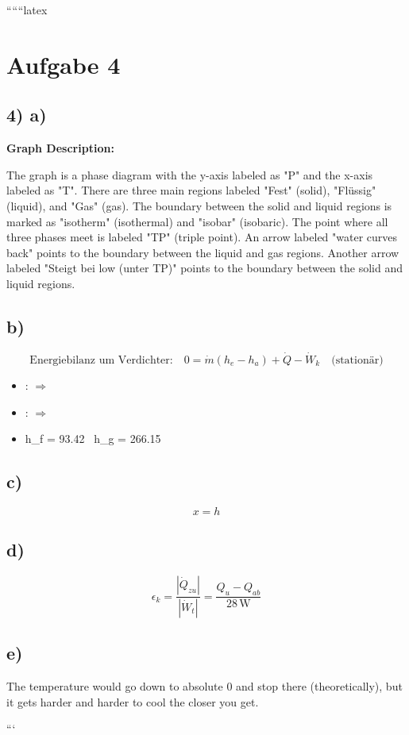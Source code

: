 
``````latex


\section*{Aufgabe 4}

\subsection*{4) a)}

\begin{center}
\textbf{Graph Description:}
\end{center}

The graph is a phase diagram with the y-axis labeled as "P" and the x-axis labeled as "T". There are three main regions labeled "Fest" (solid), "Flüssig" (liquid), and "Gas" (gas). The boundary between the solid and liquid regions is marked as "isotherm" (isothermal) and "isobar" (isobaric). The point where all three phases meet is labeled "TP" (triple point). An arrow labeled "water curves back" points to the boundary between the liquid and gas regions. Another arrow labeled "Steigt bei low (unter TP)" points to the boundary between the solid and liquid regions.

\subsection*{b)}

\begin{equation*}
\text{Energiebilanz um Verdichter:} \quad 0 = \dot{m} (h_e - h_a) + \dot{Q} - \dot{W}_k \quad \text{(stationär)}
\end{equation*}

\begin{itemize}
    \item {}: $\Rightarrow$
    \item {}: $\Rightarrow$
    \item {} \quad h_f = 93.42 \,  \quad h_g = 266.15 \, 
\end{itemize}

\subsection*{c)}

\begin{equation*}
x = h
\end{equation*}

\subsection*{d)}

\begin{equation*}
\epsilon_k = \frac{|\dot{Q}_{zu}|}{|\dot{W}_t|} = \frac{Q_u - Q_{ab}}{28 \, \text{W}}
\end{equation*}

\subsection*{e)}

The temperature would go down to absolute 0 and stop there (theoretically), but it gets harder and harder to cool the closer you get.

```